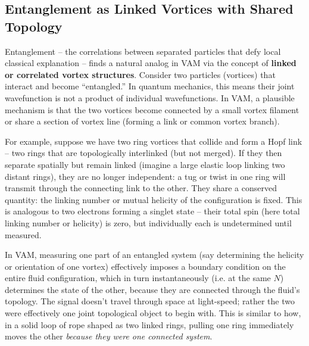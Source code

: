 \documentclass[a4paper,12pt]{article}
\begin{document}
    \subsection{Entanglement as Linked Vortices with Shared Topology}
    Entanglement – the correlations between separated particles that defy local classical explanation – finds a natural analog in VAM via the concept of \textbf{linked or correlated vortex structures}. Consider two particles (vortices) that interact and become “entangled.” In quantum mechanics, this means their joint wavefunction is not a product of individual wavefunctions. In VAM, a plausible mechanism is that the two vortices become connected by a small vortex filament or share a section of vortex line (forming a link or common vortex branch).

    For example, suppose we have two ring vortices that collide and form a Hopf link – two rings that are topologically interlinked (but not merged). If they then separate spatially but remain linked (imagine a large elastic loop linking two distant rings), they are no longer independent: a tug or twist in one ring will transmit through the connecting link to the other. They share a conserved quantity: the linking number or mutual helicity of the configuration is fixed. This is analogous to two electrons forming a singlet state – their total spin (here total linking number or helicity) is zero, but individually each is undetermined until measured.

    In VAM, measuring one part of an entangled system (say determining the helicity or orientation of one vortex) effectively imposes a boundary condition on the entire fluid configuration, which in turn instantaneously (i.e. at the same $N$) determines the state of the other, because they are connected through the fluid’s topology. The signal doesn’t travel through space at light-speed; rather the two were effectively one joint topological object to begin with. This is similar to how, in a solid loop of rope shaped as two linked rings, pulling one ring immediately moves the other \emph{because they were one connected system}.
\end{document}
